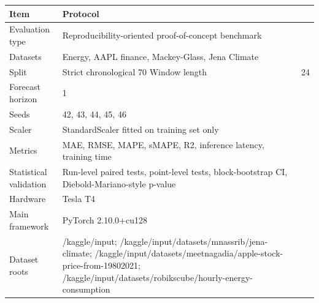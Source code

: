 \begin{tabular}{ll}
\toprule
Item & Protocol \\
\midrule
Evaluation type & Reproducibility-oriented proof-of-concept benchmark \\
Datasets & Energy, AAPL finance, Mackey-Glass, Jena Climate \\
Split & Strict chronological 70%
Window length & 24 \\
Forecast horizon & 1 \\
Seeds & 42, 43, 44, 45, 46 \\
Scaler & StandardScaler fitted on training set only \\
Metrics & MAE, RMSE, MAPE, sMAPE, R2, inference latency, training time \\
Statistical validation & Run-level paired tests, point-level tests, block-bootstrap CI, Diebold-Mariano-style p-value \\
Hardware & Tesla T4 \\
Main framework & PyTorch 2.10.0+cu128 \\
Dataset roots & /kaggle/input; /kaggle/input/datasets/mnassrib/jena-climate; /kaggle/input/datasets/meetnagadia/apple-stock-price-from-19802021; /kaggle/input/datasets/robikscube/hourly-energy-consumption \\
\bottomrule
\end{tabular}
